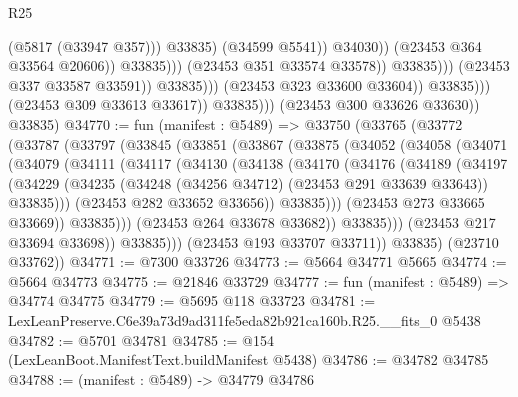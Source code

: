 \begin{lexlean}{R25}
\begin{coremodule}
                                                          (@5817 (@33947 @357)))
                                                        @33835)
                                                      (@34599 @5541))
                                                    @34030))
                                                (@23453 @364 @33564 @20606))
                                              @33835)))
                                        (@23453 @351 @33574 @33578))
                                      @33835)))
                                (@23453 @337 @33587 @33591))
                              @33835)))
                        (@23453 @323 @33600 @33604))
                      @33835)))
                (@23453 @309 @33613 @33617))
              @33835)))
        (@23453 @300 @33626 @33630))
      @33835)
@34770 := fun (manifest : @5489) =>
  @33750
    (@33765
      (@33772
        (@33787
          (@33797
            (@33845
              (@33851
                (@33867
                  (@33875
                    (@34052
                      (@34058
                        (@34071
                          (@34079
                            (@34111
                              (@34117
                                (@34130
                                  (@34138
                                    (@34170
                                      (@34176
                                        (@34189
                                          (@34197
                                            (@34229
                                              (@34235
                                                (@34248 (@34256 @34712) (@23453 @291 @33639 @33643))
                                                @33835)))
                                          (@23453 @282 @33652 @33656))
                                        @33835)))
                                  (@23453 @273 @33665 @33669))
                                @33835)))
                          (@23453 @264 @33678 @33682))
                        @33835)))
                  (@23453 @217 @33694 @33698))
                @33835)))
          (@23453 @193 @33707 @33711))
        @33835)
      (@23710 @33762))
@34771 := @7300 @33726
@34773 := @5664 @34771 @5665
@34774 := @5664 @34773
@34775 := @21846 @33729
@34777 := fun (manifest : @5489) => @34774 @34775
@34779 := @5695 @118 @33723
@34781 := LexLeanPreserve.C6e39a73d9ad311fe5eda82b921ca160b.R25.__fits_0 @5438
@34782 := @5701 @34781
@34785 := @154 (LexLeanBoot.ManifestText.buildManifest @5438)
@34786 := @34782 @34785
@34788 := (manifest : @5489) -> @34779 @34786

\end{coremodule}
\end{lexlean}
